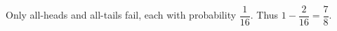 Only all-heads and all-tails fail, each with probability $\dfrac{1}{16}$. Thus $1-\dfrac{2}{16}=\boxed{\dfrac{7}{8}}$.
